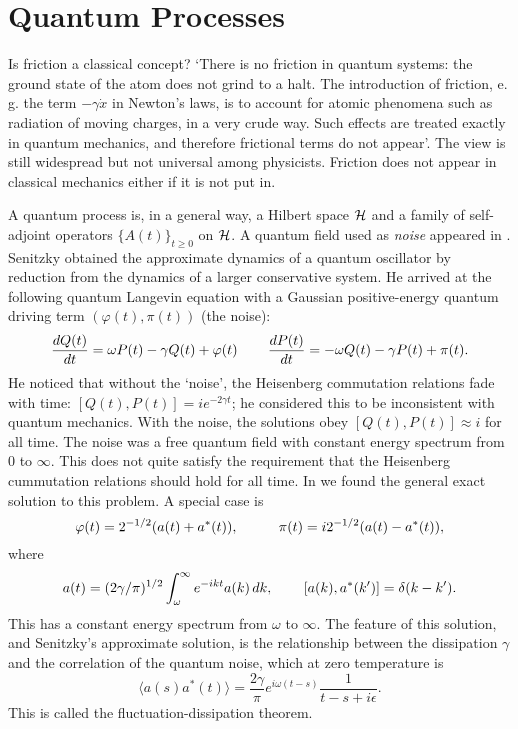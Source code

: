 \section{Quantum Processes}
Is friction a classical concept? `There is no
friction in quantum systems: the ground state of the atom does not grind
to a halt. The introduction of friction, e. g. the term
$-\gamma\dot{x}$ in Newton's laws, is to account for atomic phenomena
such as radiation of moving charges, in a very crude way. Such effects
are treated exactly in quantum mechanics, and therefore frictional terms
do not appear'. The view is still widespread but not universal among
physicists. Friction does not appear in classical mechanics either if
it is not put in.

A quantum process is, in a general way, a Hilbert space ${\cal H}$
and a family of self-adjoint operators $\{A(t)\}_{t\geq 0}$ on ${\cal H}$.
A quantum field used as {\em noise} appeared in
\cite{Senitzky}. Senitzky obtained
the approximate dynamics of a quantum oscillator by reduction
from the dynamics of a larger conservative system. He arrived at the
following quantum Langevin equation with a Gaussian positive-energy
quantum driving term $(\varphi(t),\pi(t))$ (the noise):
\begin{equation}
\frac{dQ(t)}{dt}=\omega P(t)-\gamma Q(t)+\varphi(t)\hspace{.3in}
\frac{dP(t)}{dt}=-\omega Q(t)-\gamma P(t)+\pi(t).
\end{equation}
He noticed that without the `noise', the Heisenberg commutation
relations fade with time: $[Q(t),P(t)]=ie^{-2\gamma t}$; he considered
this to be inconsistent with quantum mechanics. With the noise, the
solutions obey $[Q(t),P(t)]\approx i$ for all time. The noise
was a free quantum field with constant energy spectrum from $0$ to
$\infty$. This does not quite satisfy the requirement that the Heisenberg
cummutation relations should hold for all time. In \cite{RFS5}
we found the general exact solution to this problem.  A special case is
\[\varphi(t)=2^{-1/2}(a(t)+a^*(t)),\hspace{.4in}\pi(t)=i2^{-1/2}
(a(t)-a^*(t)),\]
where
\[a(t)=(2\gamma/\pi)^{1/2}\int_\omega^\infty e^{-ikt}a(k)\,dk,
\hspace{.3in}[a(k),a^*(k^\prime)]=\delta(k-k^\prime).\]
This has a constant energy spectrum from $\omega$ to $\infty$.
The feature of this solution, and Senitzky's approximate solution,
is the relationship between the dissipation $\gamma$ and the correlation
of the quantum noise, which at zero temperature is 
\[ \langle a(s)a^*(t)\rangle=\frac{2\gamma}{\pi}e^{i\omega(t-s)}\frac{1}{
t-s+i\epsilon}.\]
This is called the fluctuation-dissipation theorem.


